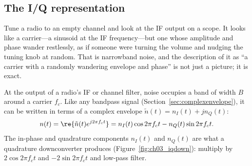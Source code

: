 \subsection{The I/Q representation}

Tune a radio to an empty channel and look at the IF output on a scope. It looks like a carrier---a
sinusoid at the IF frequency---but one whose amplitude and phase wander restlessly, as if someone were
turning the volume and nudging the tuning knob at random. That is narrowband noise, and the
description of it as ``a carrier with a randomly wandering envelope and phase'' is not just a picture;
it is exact.

At the output of a radio's IF or channel filter, noise occupies a band of width $B$ around a carrier
$f_c$. Like any bandpass signal (Section~\ref{sec:complexenvelope}), it can be written in terms of a
complex envelope $\tilde n(t)=n_I(t)+jn_Q(t)$:
\begin{equation}
n(t)=\re\{\tilde n(t)e^{j2\pi f_ct}\}=n_I(t)\cos2\pi f_ct-n_Q(t)\sin2\pi f_ct .
\label{eq:ch03:bpnoise}
\end{equation}
The in-phase and quadrature components $n_I(t)$ and $n_Q(t)$ are what a quadrature downconverter
produces (Figure~\ref{fig:ch03_iqdown}): multiply by $2\cos2\pi f_ct$ and $-2\sin2\pi f_ct$ and
low-pass filter.


